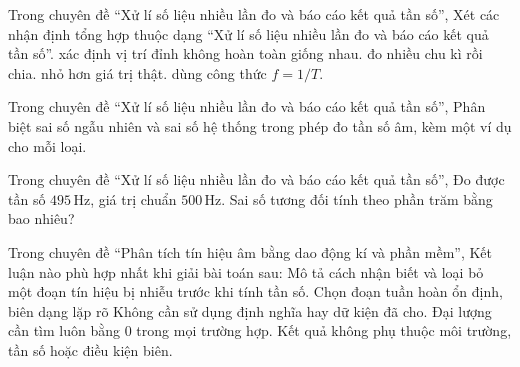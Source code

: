 \begin{ex}
Trong chuyên đề “Xử lí số liệu nhiều lần đo và báo cáo kết quả tần số”, Xét các nhận định tổng hợp thuộc dạng “Xử lí số liệu nhiều lần đo và báo cáo kết quả tần số”.
\choiceTF
{\True xác định vị trí đỉnh không hoàn toàn giống nhau.}
{\True đo nhiều chu kì rồi chia.}
{\True nhỏ hơn giá trị thật.}
{dùng công thức $f=1/T$.}
\end{ex}

\begin{ex}
Trong chuyên đề “Xử lí số liệu nhiều lần đo và báo cáo kết quả tần số”, Phân biệt sai số ngẫu nhiên và sai số hệ thống trong phép đo tần số âm, kèm một ví dụ cho mỗi loại.
\choiceTF

\end{ex}

\begin{ex}
Trong chuyên đề “Xử lí số liệu nhiều lần đo và báo cáo kết quả tần số”, Đo được tần số $495\,\text{Hz}$, giá trị chuẩn $500\,\text{Hz}$. Sai số tương đối tính theo phần trăm bằng bao nhiêu?
\end{ex}

\begin{ex}
Trong chuyên đề “Phân tích tín hiệu âm bằng dao động kí và phần mềm”, Kết luận nào phù hợp nhất khi giải bài toán sau: Mô tả cách nhận biết và loại bỏ một đoạn tín hiệu bị nhiễu trước khi tính tần số.
\choice
{\True Chọn đoạn tuần hoàn ổn định, biên dạng lặp rõ}
{Không cần sử dụng định nghĩa hay dữ kiện đã cho.}
{Đại lượng cần tìm luôn bằng 0 trong mọi trường hợp.}
{Kết quả không phụ thuộc môi trường, tần số hoặc điều kiện biên.}
\end{ex}


